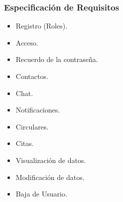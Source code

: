 \begin{frame}
	\frametitle{Especificación de Requisitos}
		\begin{itemize}
			\item Registro (Roles).
			\item Acceso.
			\item Recuerdo de la contraseña.
			\item Contactos.
			\item Chat.
			\item Notificaciones.
			\item Circulares.
			\item Citas.
			\item Visualización de datos.
			\item Modificación de datos.
			\item Baja de Usuario.
		\end{itemize}
	\endblock{}
\end{frame}